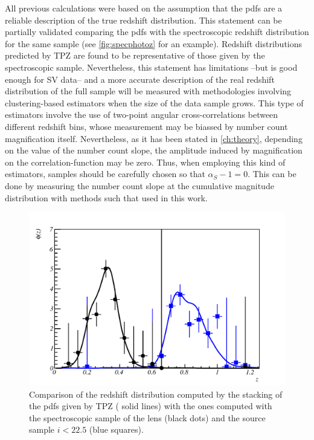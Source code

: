 All previous calculations were based on the assumption that the pdfs are a reliable description of the true redshift distribution. This statement can be partially validated comparing the pdfs with the spectroscopic redshift distribution for the same sample (see \autoref{fig:specphotoz} for an example).  Redshift distributions predicted by TPZ are found to be representative of those given by the spectroscopic sample. Nevertheless, this statement has limitations --but is good enough for SV data-- and a more accurate description of the real redshift distribution of the full sample will be measured with methodologies involving clustering-based estimators \cite{2008ApJ...684...88N,2010ApJ...721..456M,2013arXiv1303.4722M,2016MNRAS.462.1683S} when the size of the data sample grows. This type of estimators involve the use of two-point angular cross-correlations between different redshift bins, whose measurement may be biassed by number count magnification itself. Nevertheless, as it has been stated in \autoref{ch:theory}, depending on the value of the number count slope, the amplitude induced by magnification on the correlation-function may be zero. Thus, when employing this kind of estimators, samples should be carefully chosen so that $\alpha_S-1=0$. This can be done by measuring the number count slope at the cumulative magnitude distribution with methods such that used in this work.
\begin{figure}
\includegraphics[width=\textwidth]{./figures/spec_photoz_cmp.pdf}
\caption{Comparison of the redshift distribution computed by the stacking of the pdfs given by TPZ ( solid lines) with the ones computed with the spectroscopic sample of the lens (black dots) and the source sample $i<22.5$ (blue squares).}
\label{fig:specphotoz}
\end{figure}
\newline

